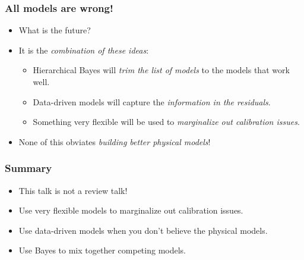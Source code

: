 \documentclass[pdftex]{beamer}
\newcommand{\conclusions}{%
\begin{frame}
  \frametitle{Summary}
  \begin{itemize}
  \item This talk is not a review talk!
  \item Use very flexible models to marginalize out calibration issues.
  \item Use data-driven models when you don't believe the physical models.
  \item Use Bayes to mix together competing models.
  \end{itemize}
\end{frame}}
\begin{document}
\begin{frame}
  \frametitle{All models are wrong!}
  \begin{itemize}
  \item What is the future?
  \item It is the \emph{combination of these ideas}:
    \begin{itemize}
    \item Hierarchical Bayes will \emph{trim the list of models} to the models that work well.
    \item Data-driven models will capture the \emph{information in the residuals}.
    \item Something very flexible will be used to \emph{marginalize out calibration issues}.
    \end{itemize}
  \item None of this obviates \emph{building better physical models}!
  \end{itemize}
\end{frame}

\conclusions
\end{document}
